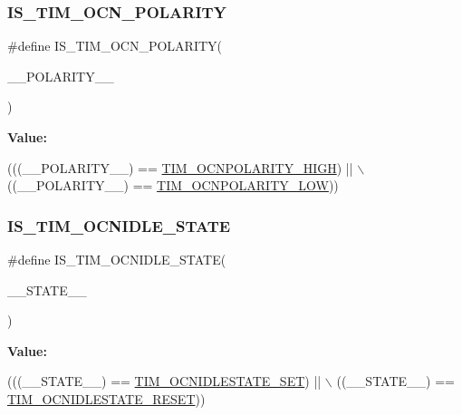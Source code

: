 \subsubsection{\texorpdfstring{I\+S\+\_\+\+T\+I\+M\+\_\+\+O\+C\+N\+\_\+\+P\+O\+L\+A\+R\+I\+TY}{IS\_TIM\_OCN\_POLARITY}}
{\footnotesize\ttfamily \#define I\+S\+\_\+\+T\+I\+M\+\_\+\+O\+C\+N\+\_\+\+P\+O\+L\+A\+R\+I\+TY(\begin{DoxyParamCaption}\item[{}]{\+\_\+\+\_\+\+P\+O\+L\+A\+R\+I\+T\+Y\+\_\+\+\_\+ }\end{DoxyParamCaption})}

{\bfseries Value\+:}
\begin{DoxyCode}
(((\_\_POLARITY\_\_) == \hyperlink{group___t_i_m___output___compare___n___polarity_gad5dbeb61519e4fd55db3a4d136e96316}{TIM\_OCNPOLARITY\_HIGH}) || \(\backslash\)
                                            ((\_\_POLARITY\_\_) == 
      \hyperlink{group___t_i_m___output___compare___n___polarity_gadb44419c891a58e2cde11cc016f71a14}{TIM\_OCNPOLARITY\_LOW}))
\end{DoxyCode}
\mbox{\label{group___t_i_m___private___macros_ga716c8082a9f18e07c876aa528a3f128d}} 
\subsubsection{\texorpdfstring{I\+S\+\_\+\+T\+I\+M\+\_\+\+O\+C\+N\+I\+D\+L\+E\+\_\+\+S\+T\+A\+TE}{IS\_TIM\_OCNIDLE\_STATE}}
{\footnotesize\ttfamily \#define I\+S\+\_\+\+T\+I\+M\+\_\+\+O\+C\+N\+I\+D\+L\+E\+\_\+\+S\+T\+A\+TE(\begin{DoxyParamCaption}\item[{}]{\+\_\+\+\_\+\+S\+T\+A\+T\+E\+\_\+\+\_\+ }\end{DoxyParamCaption})}

{\bfseries Value\+:}
\begin{DoxyCode}
(((\_\_STATE\_\_) == \hyperlink{group___t_i_m___output___compare___n___idle___state_ga1f781774c71822b2502633dfc849c5ea}{TIM\_OCNIDLESTATE\_SET}) || \(\backslash\)
                                            ((\_\_STATE\_\_) == 
      \hyperlink{group___t_i_m___output___compare___n___idle___state_ga7586655652e3c3f1cb4af1ed59d25901}{TIM\_OCNIDLESTATE\_RESET}))
\end{DoxyCode}
\mbox{\label{group___t_i_m___private___macros_gab52ffb8447abc78141e296eff57c4371}} 
